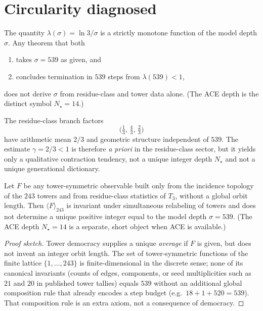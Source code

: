 \section{Circularity diagnosed}
\label{sec:circ}

\begin{lemma}
\label{lem:banach-dep}
The quantity \(\lambda(\sigma)=\ln 3/\sigma\) is a strictly monotone function
of the model depth \(\sigma\). Any theorem that both
\begin{enumerate}[label=(\alph*)]
  \item takes \(\sigma=539\) as given, and
  \item concludes termination in \(539\) steps from \(\lambda(539)<1\),
\end{enumerate}
does not derive \(\sigma\) from residue-class and tower data alone.
(The ACE depth is the distinct symbol \(N_\star=14\).)
\end{lemma}

\begin{lemma}
\label{lem:branch-mean}
The residue-class branch factors
\[
\bigl(\tfrac13,\,\tfrac43,\,\tfrac23\bigr)
\]
have arithmetic mean \(2/3\) and geometric structure independent of \(539\).
The estimate \(\gamma=2/3<1\) is therefore \emph{a priori} in the residue-class
sector, but it yields only a qualitative contraction tendency, not a unique
integer depth \(N_\star\) and not a unique generational dictionary.
\end{lemma}

\begin{lemma}[Flux democracy alone does not fix \(\sigma=539\)]
\label{lem:dem-insuff}
Let \(F\) be any tower-symmetric observable built only from the incidence
topology of the \(243\) towers and from residue-class statistics of \(T_3\),
without a global orbit length. Then \(\langle F\rangle_{243}\) is invariant
under simultaneous relabeling of towers and does not determine a unique
positive integer equal to the model depth \(\sigma=539\).
(The ACE depth \(N_\star=14\) is a separate, short object when ACE is available.)
\end{lemma}

\begin{proof}[Proof sketch]
Tower democracy supplies a unique \emph{average} if \(F\) is given, but does
not invent an integer orbit length. The set of tower-symmetric functions of
the finite lattice \(\{1,\ldots,243\}\) is finite-dimensional in the discrete
sense; none of its canonical invariants (counts of edges, components, or
seed multiplicities such as \(21\) and \(20\) in published tower tallies)
equals \(539\) without an additional global composition rule that already
encodes a step budget (e.g.\ \(18+1+520=539\)). That composition rule is an
extra axiom, not a consequence of democracy.
\end{proof}

